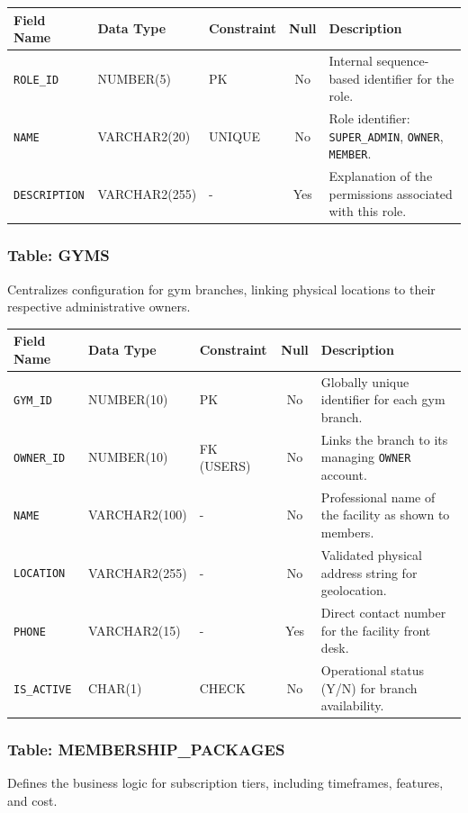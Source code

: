 \documentclass[
  12pt,
  a4paperpaper,
]{report}
\newcounter{none} %
\begin{document}
{\def\LTcaptype{none}
\begin{longtable}[]{@{}lllc p{6cm}@{}}
\hline
\textbf{Field Name} & \textbf{Data Type} & \textbf{Constraint} & \textbf{Null} & \textbf{Description} \\
\hline
\endhead
\hline
\endlastfoot
\texttt{ROLE\_ID} & NUMBER(5) & PK & No & Internal sequence-based identifier for the role. \\
\texttt{NAME} & VARCHAR2(20) & UNIQUE & No & Role identifier: \texttt{SUPER\_ADMIN}, \texttt{OWNER}, \texttt{MEMBER}. \\
\texttt{DESCRIPTION} & VARCHAR2(255) & - & Yes & Explanation of the permissions associated with this role. \\
\hline
\end{longtable}
}

\subsubsection{Table: GYMS}
Centralizes configuration for gym branches, linking physical locations to their respective administrative owners.

{\def\LTcaptype{none}
\begin{longtable}[]{@{}lllc p{6cm}@{}}
\hline
\textbf{Field Name} & \textbf{Data Type} & \textbf{Constraint} & \textbf{Null} & \textbf{Description} \\
\hline
\endhead
\hline
\endlastfoot
\texttt{GYM\_ID} & NUMBER(10) & PK & No & Globally unique identifier for each gym branch. \\
\texttt{OWNER\_ID} & NUMBER(10) & FK (USERS) & No & Links the branch to its managing \texttt{OWNER} account. \\
\texttt{NAME} & VARCHAR2(100) & - & No & Professional name of the facility as shown to members. \\
\texttt{LOCATION} & VARCHAR2(255) & - & No & Validated physical address string for geolocation. \\
\texttt{PHONE} & VARCHAR2(15) & - & Yes & Direct contact number for the facility front desk. \\
\texttt{IS\_ACTIVE} & CHAR(1) & CHECK & No & Operational status (Y/N) for branch availability. \\
\hline
\end{longtable}
}

\subsubsection{Table: MEMBERSHIP\_PACKAGES}
Defines the business logic for subscription tiers, including timeframes, features, and cost.
\end{document}
